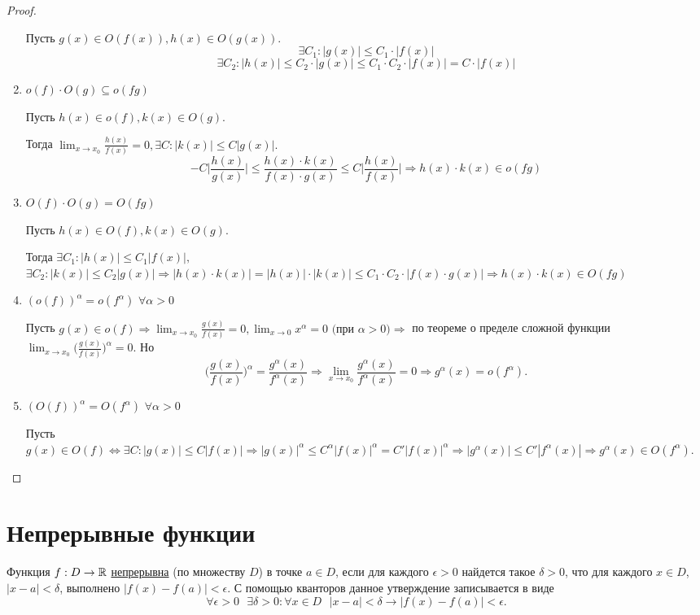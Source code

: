\begin{proof}
\begin{enumerate}
			Пусть $g(x) \in O(f(x)), h(x) \in O(g(x)).$
			\[ \exists C_1: |g(x)| \leqslant C_1 \cdot |f(x)| \]
			\[ \exists C_2: |h(x)| \leqslant C_2 \cdot |g(x)| \leqslant C_1 \cdot C_2 \cdot |f(x)| = C \cdot |f(x)| \]
			\item $o(f) \cdot O(g) \subseteq o(fg)$
			
			Пусть $h(x) \in o(f), k(x) \in O(g).$
			
			Тогда $\lim_{x \to x_0} \frac{h(x)}{f(x)} = 0, \exists C: |k(x)| \leqslant C|g(x)|.$
			\[ -C \bigg|\frac{h(x)}{g(x)}\bigg| \leqslant \frac{h(x) \cdot k(x)}{f(x) \cdot g(x)} \leqslant C \bigg|\frac{h(x)}{f(x)}\bigg| \Rightarrow h(x) \cdot k(x) \in o(fg) \]
			\item $O(f) \cdot O(g) = O(fg)$
			
			Пусть $h(x) \in O(f), k(x) \in O(g).$
			
			Тогда $\exists C_1 : |h(x)| \leqslant C_1 |f(x)|,$ $\exists C_2 : |k(x)| \leqslant C_2 |g(x)| \Rightarrow |h(x) \cdot k(x)| = |h(x)| \cdot |k(x)| \leqslant C_1 \cdot C_2 \cdot |f(x) \cdot g(x)| \Rightarrow h(x) \cdot k(x) \in O(fg)$
			\item $(o(f))^{\alpha} = o(f^{\alpha})$ $\forall \alpha > 0$
			
			Пусть $g(x) \in o(f) \Rightarrow \lim_{x \to x_0} \frac{g(x)}{f(x)} = 0, \lim_{x \to 0} x^{\alpha} = 0 \text{ (при } \alpha > 0) \Rightarrow$ по теореме о пределе сложной функции $\lim_{x \to x_0} \big(\frac{g(x)}{f(x)}\big)^{\alpha} = 0.$ Но
			\[ \bigg(\frac{g(x)}{f(x)}\bigg)^{\alpha} = \frac{g^{\alpha}(x)}{f^{\alpha}(x)} \Rightarrow \lim_{x \to x_0} \frac{g^{\alpha}(x)}{f^{\alpha}(x)} = 0 \Rightarrow g^{\alpha}(x) = o(f^{\alpha}). \]
			\item $(O(f))^{\alpha} = O(f^{\alpha})$ $\forall \alpha > 0$
			
			Пусть $g(x) \in O(f) \Leftrightarrow \exists C: |g(x)| \leqslant C|f(x)| \Rightarrow |g(x)|^{\alpha} \leqslant C^{\alpha} |f(x)|^{\alpha} = C'|f(x)|^{\alpha} \Rightarrow |g^{\alpha}(x)| \leqslant C'|f^{\alpha}(x)| \Rightarrow g^{\alpha}(x) \in O(f^{\alpha}).$
		\end{enumerate}
	\end{proof}
	
	\chapter{Непрерывные функции}
	
	\begin{definition}
		Функция $f : D \rightarrow \mathbb R$ \underline{непрерывна} (по множеству $D$) в точке $a \in D$, если для каждого $\epsilon > 0$ найдется такое $\delta > 0$, что для каждого $x \in D$, $|x - a| < \delta$, выполнено $|f(x) - f(a)| < \epsilon$. С помощью кванторов данное утверждение записывается в виде
		\[ \forall \epsilon > 0 \text{ } \exists \delta > 0: \forall x \in D \text{ } |x - a| < \delta \rightarrow |f(x) - f(a)| < \epsilon. \]
	\end{definition}
	
